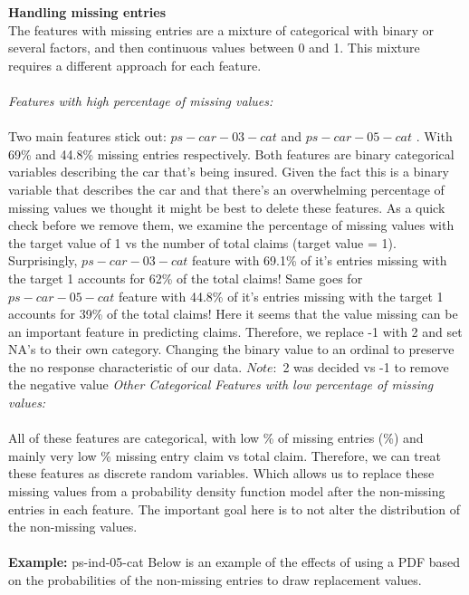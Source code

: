 \documentclass[fleqn,10pt]{SelfArx} %
\begin{document}
\textbf{Handling missing entries}\\
The features with missing entries are a mixture of categorical with binary or several factors, and then continuous values between 0 and 1. This mixture requires a different approach for each feature.\\\\
\textit{Features with high percentage of missing values:}\\
\\
Two main features stick out: $ps-car-03-cat$ and $ps-car-05-cat$ . With 69\% and 44.8\% missing entries respectively. Both features are binary categorical variables describing the car that's being insured. Given the fact this is a binary variable that describes the car and that there's an overwhelming percentage of missing values we thought it might be best to delete these features. As a quick check before we remove them, we examine the percentage of missing values with the target value of 1 vs the number of total claims (target value = 1). Surprisingly, $ps-car-03-cat$ feature with 69.1\% of it's entries missing with the target 1 accounts for 62\% of the total claims! Same goes for $ps-car-05-cat$  feature with 44.8\% of it's entries missing with the target 1 accounts for 39\% of the total claims! Here it seems that the value missing can be an important feature in predicting claims. Therefore, we replace -1 with 2 and set NA's to their own category. Changing the binary value to an ordinal to preserve the no response characteristic of our data. $Note:$ 2 was decided vs -1 to remove the negative value
\textit{Other Categorical Features with low percentage of missing values:}\\
\\
All of these features are categorical, with low \% of missing entries (\%) and mainly very low \% missing entry claim vs total claim. Therefore, we can treat these features as discrete random variables. Which allows us to replace these missing values from a probability density function model after the non-missing entries in each feature. The important goal here is to not alter the distribution of the non-missing values. \\
\\
\textbf{Example:} ps-ind-05-cat
Below is an example of the effects of using a PDF based on the probabilities of the non-missing entries to draw replacement values.\\
\end{document}
